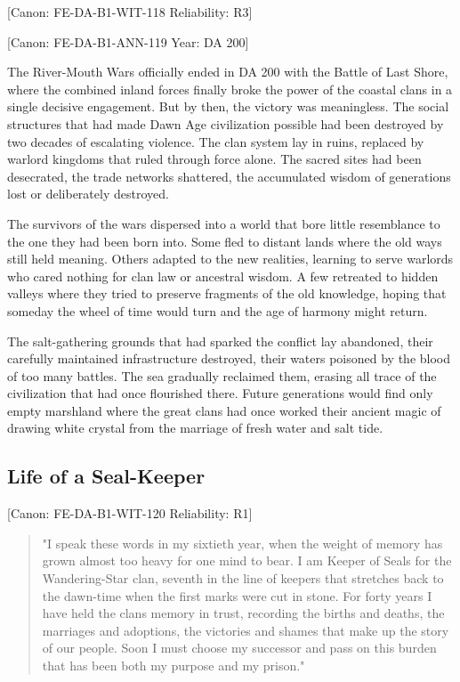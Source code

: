 {[}Canon: FE-DA-B1-WIT-118 \textbar{} Reliability: R3{]}

{[}Canon: FE-DA-B1-ANN-119 \textbar{} Year: DA 200{]}

The River-Mouth Wars officially ended in DA 200 with the Battle of Last
Shore, where the combined inland forces finally broke the power of the
coastal clans in a single decisive engagement. But by then, the victory
was meaningless. The social structures that had made Dawn Age
civilization possible had been destroyed by two decades of escalating
violence. The clan system lay in ruins, replaced by warlord kingdoms
that ruled through force alone. The sacred sites had been desecrated,
the trade networks shattered, the accumulated wisdom of generations lost
or deliberately destroyed.

The survivors of the wars dispersed into a world that bore little
resemblance to the one they had been born into. Some fled to distant
lands where the old ways still held meaning. Others adapted to the new
realities, learning to serve warlords who cared nothing for clan law or
ancestral wisdom. A few retreated to hidden valleys where they tried to
preserve fragments of the old knowledge, hoping that someday the wheel
of time would turn and the age of harmony might return.

The salt-gathering grounds that had sparked the conflict lay abandoned,
their carefully maintained infrastructure destroyed, their waters
poisoned by the blood of too many battles. The sea gradually reclaimed
them, erasing all trace of the civilization that had once flourished
there. Future generations would find only empty marshland where the
great clans had once worked their ancient magic of drawing white crystal
from the marriage of fresh water and salt tide.

\subsection{Life of a Seal-Keeper}\label{life-of-a-seal-keeper}

{[}Canon: FE-DA-B1-WIT-120 \textbar{} Reliability: R1{]}

\begin{quote}
"I speak these words in my sixtieth year, when the weight of memory has
grown almost too heavy for one mind to bear. I am Keeper of Seals for
the Wandering-Star clan, seventh in the line of keepers that stretches
back to the dawn-time when the first marks were cut in stone. For forty
years I have held the clan\textquotesingle s memory in trust, recording
the births and deaths, the marriages and adoptions, the victories and
shames that make up the story of our people. Soon I must choose my
successor and pass on this burden that has been both my purpose and my
prison."
\end{quote}

